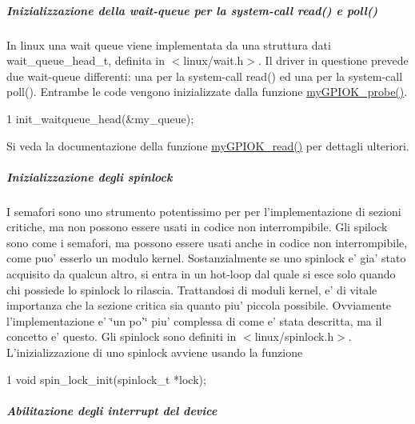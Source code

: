 \subparagraph*{Inizializzazione della wait-\/queue per la system-\/call read() e poll()}

In linux una wait queue viene implementata da una struttura dati wait\+\_\+queue\+\_\+head\+\_\+t, definita in $<$linux/wait.\+h$>$. Il driver in questione prevede due wait-\/queue differenti\+: una per la system-\/call read() ed una per la system-\/call poll(). Entrambe le code vengono inizializzate dalla funzione \hyperlink{group___kernel-_module_gae40973a06d72f7c41a9af07513a62307}{my\+G\+P\+I\+O\+K\+\_\+probe()}. 
\begin{DoxyCode}
1 init\_waitqueue\_head(&my\_queue);
\end{DoxyCode}
 Si veda la documentazione della funzione \hyperlink{group___kernel-_module_ga90ac339df9c02ae5f11a2a7727adc923}{my\+G\+P\+I\+O\+K\+\_\+read()} per dettagli ulteriori.

\subparagraph*{Inizializzazione degli spinlock}

I semafori sono uno strumento potentissimo per per l'implementazione di sezioni critiche, ma non possono essere usati in codice non interrompibile. Gli spilock sono come i semafori, ma possono essere usati anche in codice non interrompibile, come puo' esserlo un modulo kernel. Sostanzialmente se uno spinlock e' gia' stato acquisito da qualcun altro, si entra in un hot-\/loop dal quale si esce solo quando chi possiede lo spinlock lo rilascia. Trattandosi di moduli kernel, e' di vitale importanza che la sezione critica sia quanto piu' piccola possibile. Ovviamente l'implementazione e' \char`\"{}un po'\char`\"{} piu' complessa di come e' stata descritta, ma il concetto e' questo. Gli spinlock sono definiti in $<$linux/spinlock.\+h$>$. L'inizializzazione di uno spinlock avviene usando la funzione 
\begin{DoxyCode}
1 void spin\_lock\_init(spinlock\_t *lock);
\end{DoxyCode}


\subparagraph*{Abilitazione degli interrupt del device}

